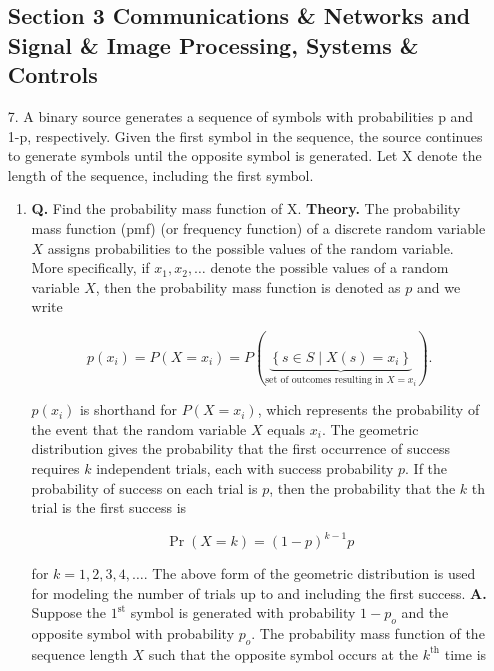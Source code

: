 \documentclass[main.tex]{subfiles}
\begin{document}
\begin{enumerate}

\subsection*{Section 3 Communications \& Networks and Signal \& Image Processing, Systems \& Controls}

\item [7.] A binary source generates a sequence of symbols with probabilities p and 1-p, respectively. Given the first symbol in the sequence, the source continues to generate symbols until the opposite symbol is generated. Let X denote the length of the sequence, including the first symbol.

    \begin{enumerate}
        \item \textbf{Q.} Find the probability mass function of X. \textbf{Theory.} The probability mass function (pmf) (or frequency function) of a discrete random variable $X$ assigns probabilities to the possible values of the random variable. More specifically, if $x_1, x_2, \ldots$ denote the possible values of a random variable $X$, then the probability mass function is denoted as $p$ and we write
        
        $$
        p\left(x_i\right)=P\left(X=x_i\right)=P(\underbrace{\left\{s \in S \mid X(s)=x_i\right\}}_{\text {set of outcomes resulting in } X=x_i}) .
        $$
        
        $p\left(x_i\right)$ is shorthand for $P\left(X=x_i\right)$, which represents the probability of the event that the random variable $X$ equals $x_i$. The geometric distribution gives the probability that the first occurrence of success requires $k$ independent trials, each with success probability $p$. If the probability of success on each trial is $p$, then the probability that the $k$ th trial is the first success is
        
        $$
        \operatorname{Pr}(X=k)=(1-p)^{k-1} p
        $$
        
        for $k=1,2,3,4, \ldots$. The above form of the geometric distribution is used for modeling the number of trials up to and including the first success. \textbf{A.} Suppose the $1^{\text{st}}$ symbol is generated with probability $1-p_o$ and the opposite symbol with probability $p_o$. The probability mass function of the sequence length $X$ such that the opposite symbol occurs at the $k^{\text{th}}$ time is
        

\end{enumerate}
\end{enumerate}
\end{document}
